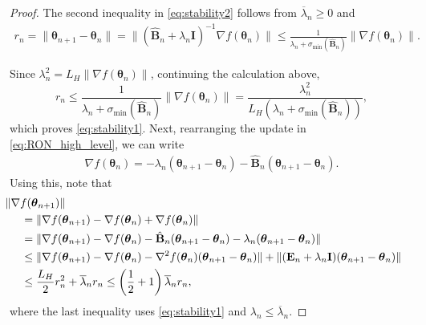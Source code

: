 \documentclass[11pt]{amsart}
\theoremstyle{plain}
\theoremstyle{definition}
\theoremstyle{remark}
\def\bE{\mathbf{E}}
\def\H{\mathbf{H}}
\def\I{\mathbf{I}}
\def\eps{\varepsilon}
\def\B{\mathbf{B}}
\def\param{\boldsymbol{\theta}}
\def\I{\mathbf{I}}
\newcommand{\commHL}[1]{{\textcolor{blue}{#1}}}
\begin{document}
\begin{proof}
    The second inequality in \eqref{eq:stability2} follows from $\overline{\lambda}_{n}\ge 0$ and 
	\begin{align*}
		r_n=\|\param_{n+1}-\param_{n}\| =\|  (\hat{\B}_{n}+\lambda_{n}\I)^{-1}\nabla f(\param_n)\| 
		\leq \frac{1}{\lambda_{n}+\sigma_{\min}(\hat{\B}_n)}\|\nabla f(\param_n)\|.
	\end{align*}
    
    Since $\lambda_n^{2}= L_H\|\nabla f(\param_n)\|$, continuing the calculation above, 
    \[
    r_n
		\leq \frac{1}{\lambda_{n}+\sigma_{\min}(\hat{\B}_n)}\|\nabla f(\param_n)\| =  \frac{\lambda_n^2}{L_H(\lambda_{n}+\sigma_{\min}(\hat{\B}_n))},
    \]
     which proves \eqref{eq:stability1}. %
	Next, rearranging the update in \eqref{eq:RON_high_level}, we can write 
	\begin{align*}
		\nabla f(\param_{n})=-\lambda_{n} (\param_{n+1}-\param_{n})-\hat{\B}_{n} (\param_{n+1}-\param_{n}) . 
	\end{align*}
Using this, note that 
\begin{align*}
	&\hspace{-0.5cm}\|\nabla f(\param_{n+1})\|\\
    &= \|\nabla f(\param_{n+1})-\nabla f(\param_{n})+\nabla f(\param_{n})\|\\
    &= \|\nabla f(\param_{n+1}) - \nabla f(\param_n) - \hat{\B}_{n}(\param_{n+1} - \param_n) - \lambda_n (\param_{n+1} - \param_n) \| \notag \\
	&\leq \|\nabla f(\param_{n+1}) - \nabla f(\param_n) - \nabla^2f(\param_n)(\param_{n+1} - \param_n)\| +  \|(\bE_n+\lambda_n\mathbf{I})(\param_{n+1} - \param_n)\| \notag \\
	&\leq \frac{L_{H}}{2} r_{n}^{2} +\overline{\lambda}_{n} r_{n} \le \left(\frac{1}{2}+1\right)\overline{\lambda}_nr_{n},
\end{align*}
where the last inequality uses \eqref{eq:stability1} and $\lambda_n\leq \overline{\lambda}_n$. 
\end{proof}
\end{document}
